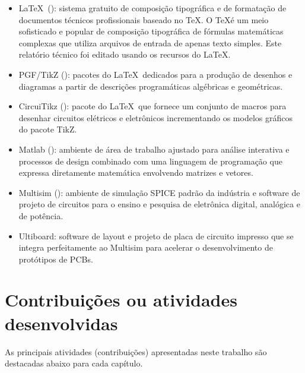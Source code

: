 \begin{itemize}
	\item \LaTeX \, (\cite{LatexCookbook}):  sistema gratuito de composição tipográfica e de formatação de documentos técnicos profissionais baseado no \TeX. O \TeX é um meio sofisticado e popular de composição tipográfica de fórmulas matemáticas complexas que utiliza  arquivos de entrada  de apenas texto simples. Este relatório técnico foi editado usando os recursos do \LaTeX.
	\item PGF/TikZ (\cite{pgftikz}):  pacotes do \LaTeX  \, dedicados para a produção de desenhos e diagramas a partir de descrições programáticas algébricas e geométricas.
	\item CircuiTikz (\cite{circuitikz}):   pacote do \LaTeX   \, que fornece um conjunto de macros para desenhar  circuitos elétricos e eletrônicos incrementando os modelos gráficos do pacote TikZ.
	\item Matlab (\cite{Matlab}): ambiente de área de trabalho ajustado para análise interativa e processos de design combinado com uma linguagem de programação que expressa diretamente matemática envolvendo matrizes e vetores.
	\item Multisim (\cite{multisim2010}):  ambiente de simulação SPICE padrão da indústria e software de projeto de circuitos para o ensino e pesquisa de eletrônica digital, analógica e de potência.
	\item Ultiboard:  software de layout e projeto de placa de circuito impresso que se integra perfeitamente ao Multisim para acelerar o desenvolvimento de protótipos de PCBs.
\end{itemize}


\section{Contribuições ou atividades desenvolvidas}\label{sec:Descricao_Atividades}

As principais atividades (contribuições) apresentadas neste trabalho são destacadas abaixo para cada capítulo.

